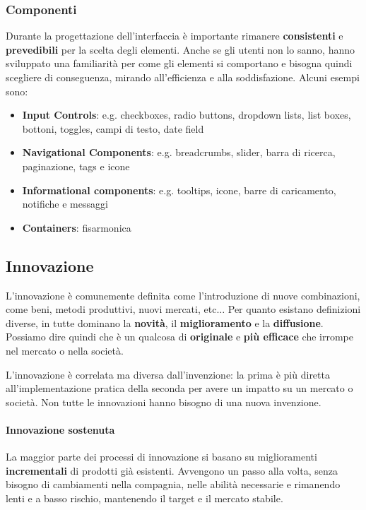 \subsubsection{Componenti}
Durante la progettazione dell'interfaccia è importante rimanere \textbf{consistenti} e \textbf{prevedibili} per la scelta degli elementi. Anche se gli utenti non lo sanno, hanno sviluppato una familiarità per come gli elementi si comportano e bisogna quindi scegliere di conseguenza, mirando all'efficienza e alla soddisfazione. Alcuni esempi sono:
\begin{itemize}
	\item \textbf{Input Controls}: e.g. checkboxes, radio buttons, dropdown lists, list boxes, bottoni, toggles, campi di testo, date field
	\item \textbf{Navigational Components}: e.g. breadcrumbs, slider, barra di ricerca, paginazione, tags e icone
	\item \textbf{Informational components}: e.g. tooltips, icone, barre di caricamento, notifiche e messaggi
	\item \textbf{Containers}: fisarmonica
\end{itemize}

\subsection{Innovazione}
L'innovazione è comunemente definita come l'introduzione di nuove combinazioni, come beni, metodi produttivi, nuovi mercati, etc$\ldots$ Per quanto esistano definizioni diverse, in tutte dominano la \textbf{novità}, il \textbf{miglioramento} e la \textbf{diffusione}. Possiamo dire quindi che è un qualcosa di \textbf{originale} e \textbf{più efficace} che irrompe nel mercato o nella società.

\begin{note}[Invenzione]
	L'innovazione è correlata ma diversa dall'invenzione: la prima è più diretta all'implementazione pratica della seconda per avere un impatto su un mercato  o società. Non tutte le innovazioni hanno bisogno di una nuova invenzione.
\end{note}

\paragraph{Innovazione sostenuta} La maggior parte dei processi di innovazione si basano su miglioramenti \textbf{incrementali} di prodotti già esistenti. Avvengono un passo alla volta, senza bisogno di cambiamenti nella compagnia, nelle abilità necessarie e rimanendo lenti e a basso rischio, mantenendo il target e il mercato stabile.

